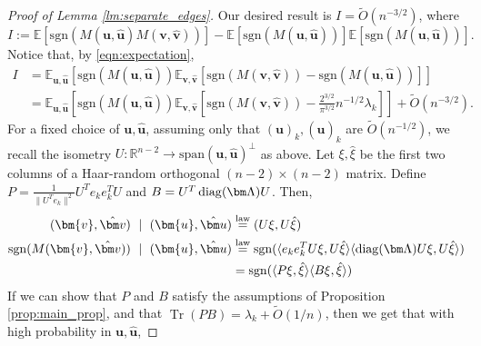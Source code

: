 \documentclass[reqno]{amsart}
\numberwithin{equation}{section}
\newcommand\E{\mathbb{E}}
\newcommand\R{\mathbb{R}}
\newcommand\rem{\tilde{O}\left(n^{-3/2}\right)}
\newcommand\bu{\bm{u}}
\newcommand\hu{\hat{\bm u}}
\newcommand\bv{\bm{v}}
\newcommand\hv{\hat{\bm v}}
\newcommand\Tr{{\operatorname{Tr}}}
\newcommand{\diag}{\mathop {\rm diag}}
\begin{document}
\begin{proof}[Proof of Lemma \ref{lm:separate_edges}]
Our desired result is $I=\tilde{O}(n^{-3/2})$, where
\[I:=\E[\mathrm{sgn}\left(M(\bu,\hu)M(\bv,\hv)\right)]-\E[\mathrm{sgn}(M(\bu,\hu))]\E[\mathrm{sgn}\left(M(\bu,\hu)\right)].\]
Notice that, by \eqref{eqn:expectation}, 
\begin{align*}
I&=\E_{\bu,\hu}\left[\mathrm{sgn}\left(M(\bu,\hu)\right)\E_{\bv,\hv}\left[\mathrm{sgn}\left(M(\bv,\hv)\right)-\mathrm{sgn}\left(M(\bu,\hu)\right)\right]\right]\\
&=\E_{\bu,\hu}\left[\mathrm{sgn}\left(M(\bu,\hu)\right)\E_{\bv,\hv}\left[\mathrm{sgn}\left(M(\bv,\hv)\right)-\frac{2^{3/2}}{\pi^{3/2}}n^{-1/2}\lambda_{k}\right]\right]+\rem.
\end{align*}
For a fixed choice of $\bu,\hu$, assuming only that $(\bu)_k,(\hu)_k$ are $\tilde{O}(n^{-1/2})$, we recall the isometry $U:\R^{n-2}\to\mathrm{span}(\bu,\hu)^{\perp}$ as above.
Let $\xi,\hat{\xi}$ be the first two columns of a Haar-random orthogonal $(n-2)\times (n-2)$ matrix. Define $P=\frac{1}{\|U^{T}e_k\|^2}U^Te_{k}e_{k}^{T}U$ and $B=U^T\diag(\bm\Lambda)U$. Then, 
\begin{align*}
    (\bv,\hv)\ \mid\ (\bu,\hu)& \stackrel{\mathrm{law}}{=}(U\xi,U\hat{\xi})\\
    \mathrm{sgn}(M(\bv,\hv))\ \mid\ (\bu,\hu)
 & \stackrel{\mathrm{law}}{=}\mathrm{sgn}(\langle e_{k}e_{k}^{T}U\xi,U\hat{\xi}\rangle\langle\diag(\bm\Lambda)U\xi,U\hat{\xi}\rangle)\\
 & = \mathrm{sgn}(\langle P\xi,\hat{\xi}\rangle\langle B\xi,\hat{\xi}\rangle)
\end{align*}
If we can show that $P$ and $B$ satisfy the assumptions of Proposition \ref{prop:main_prop}, and that $\Tr(PB)=\lambda_k+\tilde{O}(1/n)$, then we get that with high probability in $\bu,\hu$,

\end{proof}
\end{document}
